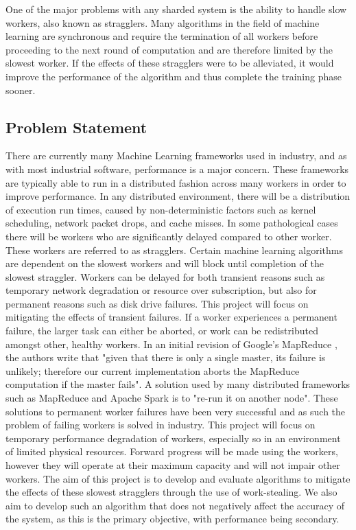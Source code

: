 \documentclass[12pt]{article}
\begin{document}
\newline
\newline
One of the major problems with any sharded system is the ability to handle slow workers, also known as stragglers. Many algorithms in the field of machine learning are synchronous and require the termination of all workers before proceeding to the next round of computation and are therefore limited by the slowest worker. If the effects of these stragglers were to be alleviated, it would improve the performance of the algorithm and thus complete the training phase sooner.  

\newpage

\subsection{Problem Statement}
There are currently many Machine Learning frameworks used in industry, and as with most industrial software, performance is a major concern. These frameworks are typically able to run in a distributed fashion across many workers in order to improve performance. In any distributed environment, there will be a distribution of execution run times, caused by non-deterministic factors such as kernel scheduling, network packet drops, and cache misses. In some pathological cases there will be workers who are significantly delayed compared to other worker. These workers are referred to as stragglers. Certain machine learning algorithms are dependent on the slowest workers and will block until completion of the slowest straggler.
\newline
Workers can be delayed for both transient reasons such as temporary network degradation or resource over subscription, but also for permanent reasons such as disk drive failures. This project will focus on mitigating the effects of transient failures. If a worker experiences a permanent failure, the larger task can either be aborted, or work can be redistributed amongst other, healthy workers. In an initial revision of Google's MapReduce \citep{dean2008mapreduce}, the authors write that "given that there is only a single master, its failure is unlikely; therefore our current implementation aborts the MapReduce computation if the master fails". A solution used by many distributed frameworks such as MapReduce and Apache Spark \cite{zaharia2012resilient} is to "re-run it on another node".
\newline
These solutions to permanent worker failures have been very successful and as such the problem of failing workers is solved in industry. This project will focus on temporary performance degradation of workers, especially so in an environment of limited physical resources. Forward progress will be made using the workers, however they will operate at their maximum capacity and will not impair other workers.
\newline
The aim of this project is to develop and evaluate algorithms to mitigate the effects of these slowest stragglers through the use of work-stealing. We also aim to develop such an algorithm that does not negatively affect the accuracy of the system, as this is the primary objective, with performance being secondary.
\end{document}
